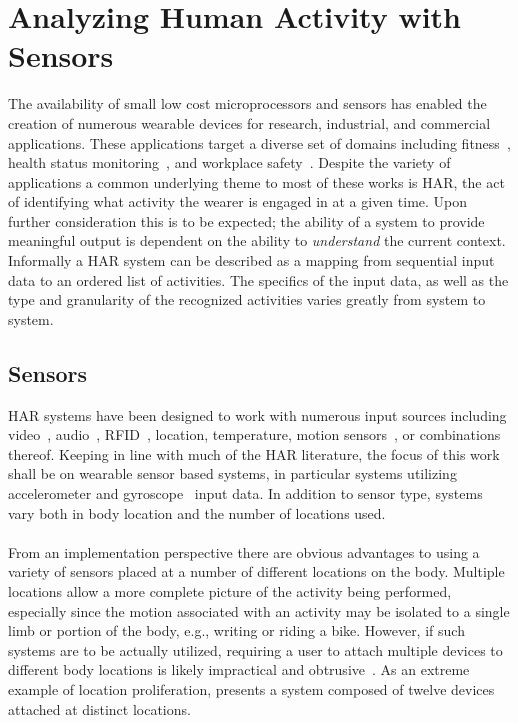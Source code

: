 \documentclass[12pt]{report}
\newcommand{\1}[0]{\mathbbm{1}}
\begin{document}
\chapter{Analyzing Human Activity with Sensors}
\label{chap:Analyzing Human Activity with Sensors}
The availability of small low cost microprocessors and sensors has
enabled the creation of numerous wearable devices for research, industrial,
and commercial applications. These applications target a diverse set of domains
including fitness~\cite{long-term-devices},
health status monitoring~\cite{elderly,health-survey},
and workplace safety~\cite{assembly-activity}.
Despite the variety of applications a common underlying theme to most of these
works is \ac{HAR}, the act of identifying what activity the wearer is engaged in at a given time.
Upon further consideration this is to be expected; the ability of a system to provide
meaningful output is dependent on the ability to \emph{understand} the current context.
Informally a \ac{HAR} system can be described as a mapping from sequential
input data to an ordered list of activities. The specifics of the input data, as well
as the type and granularity of the recognized activities varies greatly from system to system.

\section{Sensors}
\label{sec:HAR-Sensors}
\ac{HAR} systems have been designed to work with numerous input sources including
video~\cite{har-vision-survey},
audio~\cite{assembly-activity},
RFID~\cite{har-video-rfid},
location, temperature, motion sensors~\cite{har-survey},
or combinations thereof.
Keeping in line with much of the \ac{HAR} literature,
the focus of this work shall be on wearable sensor based systems,
in particular systems utilizing accelerometer and gyroscope~\cite{multiple-sensor-bao}
input data. In addition to sensor type, systems vary both in body location
and the number of locations used.
\\\\
From an implementation perspective there are obvious advantages to using a
variety of sensors placed at a number of different locations on the body. Multiple
locations allow a more complete picture of the activity being performed,
especially since the motion associated with an activity may be isolated to a
single limb or portion of the body, e.g., writing or riding a bike. However, if such
systems are to be actually utilized, requiring a user to attach multiple devices to
different body locations is likely impractical and obtrusive~\cite{har-survey}.
As an extreme example of location proliferation, \cite{many-sensor-locations} presents a
system composed of twelve devices attached at distinct locations.
\end{document}

